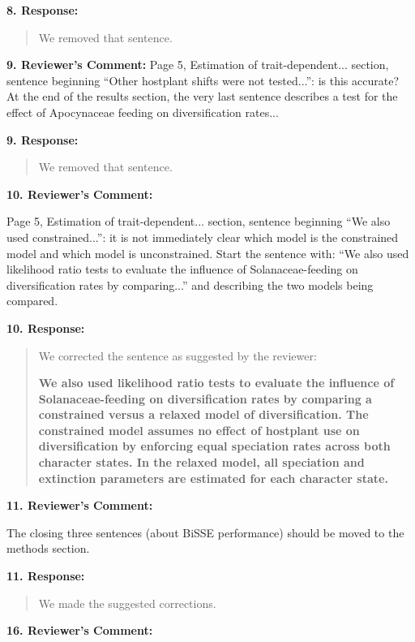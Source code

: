\documentclass[]{article}
\begin{document}
 \textbf{8. Response:}

\begin{quote}
\color{blue}
We removed that sentence.
\end{quote}

\textbf{9. Reviewer's Comment:}
Page 5, Estimation of trait-dependent... section, sentence beginning “Other hostplant shifts were not tested...”: is this accurate? At the end of the results section, the very last sentence describes a test for the effect of Apocynaceae feeding on diversification rates...

\textbf{9. Response:}

\begin{quote}
\color{blue}
We removed that sentence.
\end{quote}

\textbf{10. Reviewer's Comment:}

Page 5, Estimation of trait-dependent... section, sentence beginning “We also used constrained...”: it is not immediately clear which model is the constrained model and which model is unconstrained. Start the sentence with: “We also used likelihood ratio tests to evaluate the influence of Solanaceae-feeding on diversification rates by comparing...” and describing the two models being compared.

\textbf{10. Response:}

\begin{quote}
\color{blue}
We corrected the sentence as suggested by the reviewer:

\textbf{We also used likelihood ratio
tests to evaluate the influence of Solanaceae-feeding on diversification rates by comparing a constrained
versus a relaxed model of diversification. The constrained model assumes no effect of hostplant use on
diversification by enforcing equal speciation rates across both character states. In the relaxed model, all
speciation and extinction parameters are estimated for each character state.}
\end{quote}

\textbf{11. Reviewer's Comment:}

The closing three sentences (about BiSSE performance) should be moved to
the methods section.

\textbf{11. Response:}

\begin{quote}
\color{blue}
We made the suggested corrections.
\end{quote}

\textbf{16. Reviewer's Comment:}
\end{document}
